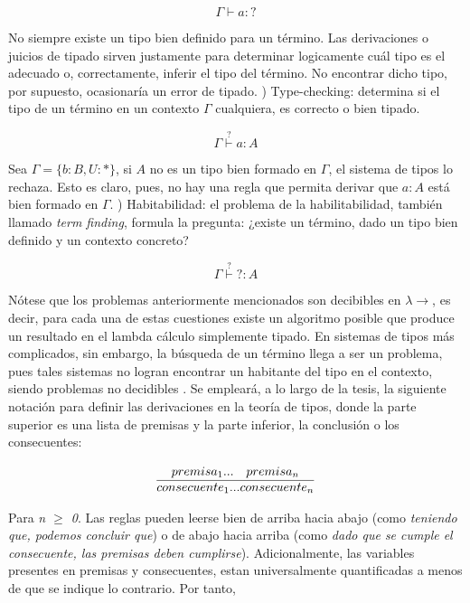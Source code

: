 \[
  \Gamma \vdash a : ?
\]

No siempre existe un tipo bien definido para un término. Las derivaciones o juicios de tipado sirven justamente para determinar logicamente cuál tipo es el adecuado o, correctamente, inferir el tipo del término. No encontrar dicho tipo, por supuesto, ocasionaría un error de tipado.
\newline
{}) Type-checking: determina si el tipo de un término en un contexto $\Gamma$ cualquiera, es correcto o bien tipado.

\[
  \Gamma \overset{?}{\vdash} a : A
\]

Sea $\Gamma = \{b : B, U : *\}$, si $A$ no es un tipo bien formado en $\Gamma$, el sistema de tipos lo rechaza. Esto es claro, pues, no hay una regla que permita derivar que $a : A$ está bien formado en $\Gamma$.
\newline
{}) Habitabilidad: el problema de la habilitabilidad, también llamado \textit{term finding}, formula la pregunta: ¿existe un término, dado un tipo bien definido y un contexto concreto?

\[
  \Gamma \overset{?}{\vdash} ? : A
\]

Nótese que los problemas anteriormente mencionados son decibibles en $\lambda\to$, es decir, para cada una de estas cuestiones existe un algoritmo posible que produce un resultado en el lambda cálculo simplemente tipado. En sistemas de tipos más complicados, sin embargo, la búsqueda de un término llega a ser un problema, pues tales sistemas no logran encontrar un habitante del tipo en el contexto, siendo problemas no decidibles \citep{b-calculi}.
\newline
\newline
\indent Se empleará, a lo largo de la tesis, la siguiente notación para definir las derivaciones en la teoría de tipos, donde la parte superior es una lista de premisas y la parte inferior, la conclusión o los consecuentes:

\begin{align}
\infer{consecuente_1 ... consecuente_n}{%
    premisa_1
    ...
    & \deduce{premisa_n}{}
  }
\end{align}

Para \textit{n $\geq$ 0}. Las reglas pueden leerse bien de arriba hacia abajo (como \textit{teniendo que, podemos concluir que}) o de abajo hacia arriba (como \textit{dado que se cumple el consecuente, las premisas deben cumplirse}). Adicionalmente, las variables presentes en premisas y consecuentes, estan universalmente quantificadas a menos de que se indique lo contrario. Por tanto,

